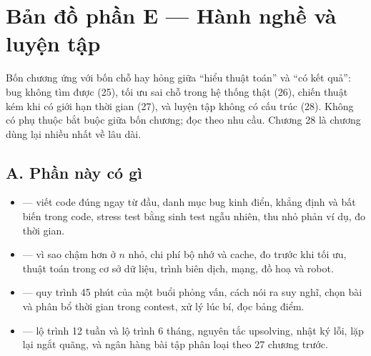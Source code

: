 \documentclass[../algorithm.tex]{subfiles}
\begin{document}
\section*{Bản đồ phần E --- Hành nghề và luyện tập}

\begin{tomtat}
Bốn chương ứng với bốn chỗ hay hỏng giữa ``hiểu thuật toán'' và ``có kết quả'': bug không tìm được (25), tối ưu sai chỗ trong hệ thống thật (26), chiến thuật kém khi có giới hạn thời gian (27), và luyện tập không có cấu trúc (28). Không có phụ thuộc bắt buộc giữa bốn chương; đọc theo nhu cầu. Chương 28 là chương dùng lại nhiều nhất về lâu dài.
\end{tomtat}

\subsection*{A. Phần này có gì}
\begin{itemize}
\item \textbf{} --- viết code đúng ngay từ đầu, danh mục bug kinh điển, khẳng định và bất biến trong code, stress test bằng sinh test ngẫu nhiên, thu nhỏ phản ví dụ, đo thời gian.
\item \textbf{} --- vì sao  chậm hơn  ở \(n\) nhỏ, chi phí bộ nhớ và cache, đo trước khi tối ưu, thuật toán trong cơ sở dữ liệu, trình biên dịch, mạng, đồ hoạ và robot.
\item \textbf{} --- quy trình 45 phút của một buổi phỏng vấn, cách nói ra suy nghĩ, chọn bài và phân bổ thời gian trong contest, xử lý lúc bí, đọc bảng điểm.
\item \textbf{} --- lộ trình 12 tuần và lộ trình 6 tháng, nguyên tắc upsolving, nhật ký lỗi, lặp lại ngắt quãng, và ngân hàng bài tập phân loại theo 27 chương trước.
\end{itemize}
\end{document}
